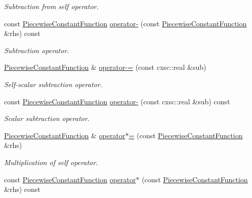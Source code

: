 \begin{DoxyCompactItemize}
\begin{DoxyCompactList}\small\item\em \-Subtraction from self operator. \end{DoxyCompactList}\item 
const \hyperlink{classsubpavings_1_1PiecewiseConstantFunction}{\-Piecewise\-Constant\-Function} \hyperlink{classsubpavings_1_1PiecewiseConstantFunction_a52b02b0ec1773ae11c4d986dd56a69f8}{operator-\/} (const \hyperlink{classsubpavings_1_1PiecewiseConstantFunction}{\-Piecewise\-Constant\-Function} \&rhs) const 
\begin{DoxyCompactList}\small\item\em \-Subtraction operator. \end{DoxyCompactList}\item 
\hyperlink{classsubpavings_1_1PiecewiseConstantFunction}{\-Piecewise\-Constant\-Function} \& \hyperlink{classsubpavings_1_1PiecewiseConstantFunction_a83ceb8a2a57cb475b400c8436ef79831}{operator-\/=} (const cxsc\-::real \&sub)
\begin{DoxyCompactList}\small\item\em \-Self-\/scalar subtraction operator. \end{DoxyCompactList}\item 
const \hyperlink{classsubpavings_1_1PiecewiseConstantFunction}{\-Piecewise\-Constant\-Function} \hyperlink{classsubpavings_1_1PiecewiseConstantFunction_ad2c304191876befbd35fac6a07dedd74}{operator-\/} (const cxsc\-::real \&sub) const 
\begin{DoxyCompactList}\small\item\em \-Scalar subtraction operator. \end{DoxyCompactList}\item 
\hyperlink{classsubpavings_1_1PiecewiseConstantFunction}{\-Piecewise\-Constant\-Function} \& \hyperlink{classsubpavings_1_1PiecewiseConstantFunction_af353f8623ce62aa2bf7e87942d5e89f7}{operator$\ast$=} (const \hyperlink{classsubpavings_1_1PiecewiseConstantFunction}{\-Piecewise\-Constant\-Function} \&rhs)
\begin{DoxyCompactList}\small\item\em \-Multiplication of self operator. \end{DoxyCompactList}\item 
const \hyperlink{classsubpavings_1_1PiecewiseConstantFunction}{\-Piecewise\-Constant\-Function} \hyperlink{classsubpavings_1_1PiecewiseConstantFunction_a64722ca127c5169779463574a35d661d}{operator$\ast$} (const \hyperlink{classsubpavings_1_1PiecewiseConstantFunction}{\-Piecewise\-Constant\-Function} \&rhs) const 

\end{DoxyCompactItemize}
